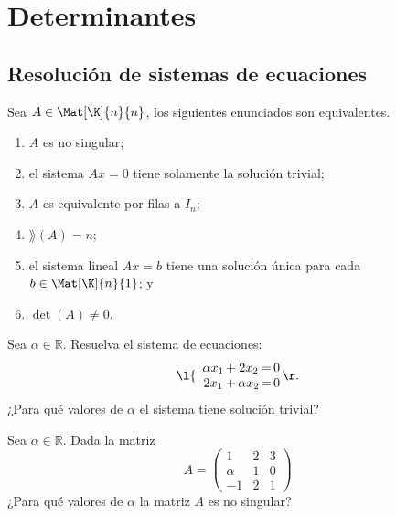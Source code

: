 \documentclass[compacto,10pt]{pubciencias-notas}
\begin{document}




\setcounter{section}{2}
\section{Determinantes}
\setcounter{subsection}{1}
\subsection{Resolución de sistemas de ecuaciones}

\begin{teo}
Sea $A\in\Mat[\K]{n}{n}$, los siguientes enunciados son equivalentes.
\begin{enumerate}
\item $A$ es no singular;
\item el sistema $Ax=0$ tiene solamente la solución trivial;
\item $A$ es equivalente por filas a $I_{n}$;
\item $\rang(A)=n$;
\item el sistema lineal $Ax=b$ tiene una solución única para cada $b\in\Mat[\K]{n}{1}$; y
\item $\det(A)\neq0$.
\end{enumerate}
\end{teo}
\begin{ejer}
    Sea $\alpha\in\mathbb{R}$. Resuelva el sistema de ecuaciones:
     \[
        \l\{
        \begin{array}{c@{\,}c@{\,}c@{\,}c@{\,}c@{\,}c@{\,}c}
        \alpha x_1  & + & 2x_2 &= & 0 \\
        2x_1  & + & \alpha x_2 &= & 0
        \end{array}
        \r.
    \]
    ¿Para qué valores de $\alpha$ el sistema tiene solución trivial?
\end{ejer}
\begin{ejer}
    Sea $\alpha\in\mathbb{R}$. Dada la matriz
     \[
        A=\begin{pmatrix}
            1&2&3\\
            \alpha&1&0\\
            -1&2&1
        \end{pmatrix}
    \]
    ¿Para qué valores de $\alpha$ la matriz $A$ es no singular?
\end{ejer}
\end{document}
